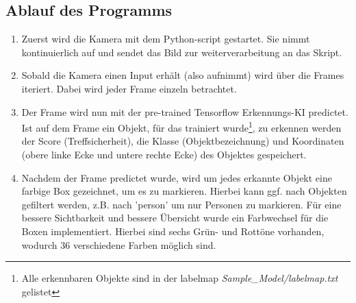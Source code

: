 \documentclass[12pt]{article}
\theoremstyle{definition}
\begin{document}
\subsection{Ablauf des Programms}
\begin{flushleft}
\begin{enumerate}
\item[Schritt 1:] Zuerst wird die Kamera mit dem Python-script gestartet. Sie nimmt kontinuierlich auf und sendet das Bild zur weiterverarbeitung an das Skript.

\item[Schritt 2:] Sobald die Kamera einen Input erhält (also aufnimmt) wird über die Frames iteriert. Dabei wird jeder Frame einzeln betrachtet.

\item[Schritt 3:] Der Frame wird nun mit der pre-trained Tensorflow Erkennungs-KI predictet. Ist auf dem Frame ein Objekt, für das trainiert wurde\footnote{Alle erkennbaren Objekte sind in der labelmap \textit{Sample\_Model/labelmap.txt} gelistet}, zu erkennen werden der Score (Treffsicherheit), die Klasse (Objektbezeichnung) und Koordinaten (obere linke Ecke und untere rechte Ecke) des Objektes gespeichert.

\item[Schritt 4:] Nachdem der Frame predictet wurde, wird um jedes erkannte Objekt eine farbige Box gezeichnet, um es zu markieren. Hierbei kann ggf. nach Objekten gefiltert werden, z.B. nach 'person' um nur Personen zu markieren. Für eine bessere Sichtbarkeit und bessere Übersicht wurde ein Farbwechsel für die Boxen implementiert. Hierbei sind sechs Grün- und Rottöne vorhanden, wodurch 36 verschiedene Farben möglich sind.


\end{enumerate}
\end{flushleft}
\end{document}
